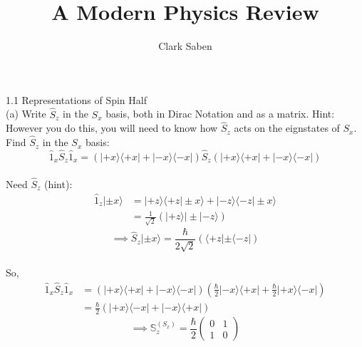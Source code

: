 \documentclass{article}
\title{A Modern Physics Review}
\author{Clark Saben}
\begin{document}
\newcommand{\pz}{\ket{\vb{+z}}}
\newcommand{\nz}{\ket{\vb{-z}}}
\newcommand{\px}{\ket{\vb{+x}}}
\newcommand{\nx}{\ket{\vb{-x}}}
\newcommand{\py}{\ket{\vb{+z}}}
\newcommand{\ny}{\ket{\vb{-y}}}

\newcommand{\pxexpr}{ \frac{1}{\sqrt{2}} \pz + \frac{1}{\sqrt{2}} \nz}
\newcommand{\nxexpr}{ \frac{1}{\sqrt{2}} \pz - \frac{1}{\sqrt{2}} \nz}
\newcommand{\pyexpr}{ \frac{1}{\sqrt{2}} \pz + \frac{i}{\sqrt{2}} \nz}
\newcommand{\nyexpr}{ \frac{1}{\sqrt{2}} \pz - \frac{i}{\sqrt{2}} \nz}
\maketitle

1.1 Representations of Spin Half\\

(a) Write $\hat{S}_z$ in the $S_x$ basis, both in Dirac Notation and as a matrix. Hint: However you do this, you will need to know how $\hat{S}_z$ acts on the eignstates of $S_x$.\\

Find $\hat{S}_z$ in the $S_x$ basis: \\
$$\hat{1}_x \hat{S}_z \hat{1}_x = \left(|+x\rangle\langle +x| + |-x\rangle\langle -x|\right) \hat{S}_z \left(|+x\rangle\langle +x| + |-x\rangle\langle -x|\right)$$\\

Need $\hat{S}_z$ (hint):\\

\begin{align*}
{\hat{1}_z |\pm x\rangle}  & = |+z\rangle \langle +z|\pm x\rangle + |-z\rangle \langle -z|\pm x\rangle\\
			   & = \frac{1}{\sqrt{2}} \left(|+z\rangle|\pm |-z\rangle\right)
\end{align*}
$$\implies \hat{S}_z |\pm x\rangle = \frac{\hbar}{2\sqrt{2}} \left(\langle+z| \pm \langle-z|\right)$$\\

So, 
\begin{align*}
	\hat{1}_x \hat{S}_z \hat{1}_x & = \left(|+x\rangle \langle+x| + |-x\rangle \langle-x|\right) \left(\frac{\hbar}{2} |-x\rangle \langle+x| + \frac{\hbar}{2} |+x\rangle \langle-x|\right)\\
				      & = \frac{\hbar}{2} \left(|+x\rangle \langle-x| + |-x\rangle \langle+x|\right)
\end{align*}
$$\implies \mathbb{S}_z^{(S_x)} = \frac{\hbar}{2} \left(\begin{array}{cc} 0 & 1 \\ 1 & 0 \end{array}\right)$$
\end{document}
